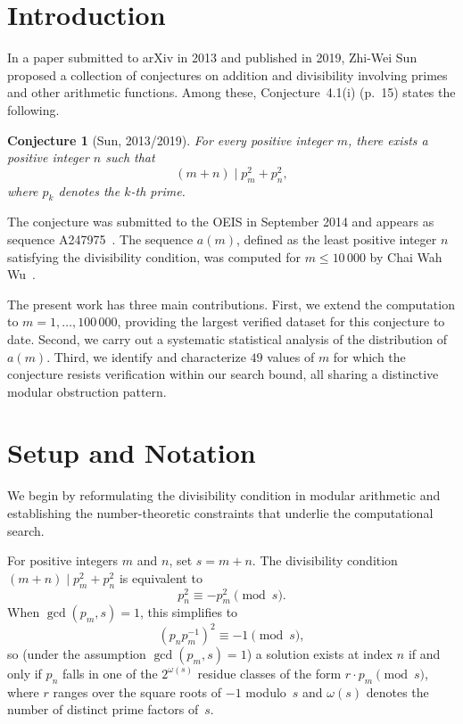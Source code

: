 \documentclass[12pt]{article}
\newtheorem{conjecture}{Conjecture}
\begin{document}
	\section{Introduction}
	
	In a paper submitted to arXiv in 2013 and published in 2019,
	Zhi-Wei Sun~\cite{Sun2019} proposed a collection of conjectures on
	addition and divisibility involving primes and other arithmetic
	functions.
	Among these, Conjecture~4.1(i) (p.~15) states the following.
	
	\begin{conjecture}[Sun, 2013/2019]\label{conj:sun}
		For every positive integer $m$, there exists a positive integer $n$
		such that
		\[
		(m + n) \mid p_m^2 + p_n^2,
		\]
		where $p_k$ denotes the $k$-th prime.
	\end{conjecture}
	
	The conjecture was submitted to the OEIS in September 2014 and appears
	as sequence A247975~\cite{OEIS_A247975}.
	The sequence $a(m)$, defined as the least positive integer $n$
	satisfying the divisibility condition, was computed for $m \leq 10\,000$
	by Chai Wah Wu~\cite{WuOEIS}.
	
	The present work has three main contributions.
	First, we extend the computation to $m = 1, \ldots, 100\,000$,
	providing the largest verified dataset for this conjecture to date.
	Second, we carry out a systematic statistical analysis of the
	distribution of $a(m)$.
	Third, we identify and characterize $49$ values of $m$ for which the
	conjecture resists verification within our search bound, all sharing a
	distinctive modular obstruction pattern.
	
	\section{Setup and Notation}
	
	We begin by reformulating the divisibility condition in modular
	arithmetic and establishing the number-theoretic constraints that
	underlie the computational search.
	
	For positive integers $m$ and $n$, set $s = m + n$.
	The divisibility condition $(m+n) \mid p_m^2 + p_n^2$ is equivalent to
	\[
	p_n^2 \equiv -p_m^2 \pmod{s}.
	\]
	When $\gcd(p_m, s) = 1$, this simplifies to
	\[
	\left( p_n p_m^{-1} \right)^2 \equiv -1 \pmod{s},
	\]
	so (under the assumption $\gcd(p_m, s) = 1$) a solution exists at
	index $n$ if and only if $p_n$ falls in one of
	the $2^{\omega(s)}$ residue classes of the form $r \cdot p_m \pmod{s}$,
	where $r$ ranges over the square roots of $-1$ modulo~$s$
	and $\omega(s)$ denotes the number of distinct prime factors of~$s$.
	
\end{document}
